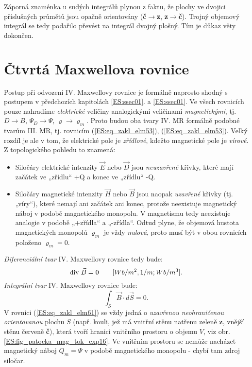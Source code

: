       Záporná znaménka u sudých integrálů plynou z faktu, že plochy ve dvojici příslušných průmětů 
      jsou opačně orientovány (\textbf{č}\(\rightarrow\)\textbf{z}, 
      \textbf{z}\(\rightarrow\)\textbf{č}). Trojný objemový integrál se tedy podařilo převést 
      na integrál dvojný plošný. Tím je důkaz věty dokončen.
      
  \section{Čtvrtá Maxwellova rovnice}\label{ES:sec09}
    Postup při odvození IV. Maxwellovy rovnice je formálně naprosto shodný s postupem v předchozích 
    kapitolách \ref{ES:ssec01}. a \ref{ES:ssec01}. Ve všech rovnicích pouze nahradíme 
    \emph{elektrické} veličiny analogickými veličinami \emph{magnetickými}, tj. \(D\rightarrow 
    B\), \(\Psi_D\rightarrow \Psi\), \(\varrho\rightarrow \varrho_m\). Proto budou oba 
    tvary IV. MR formálně podobné tvarům III. MR, tj. rovnicím (\ref{ES:eq_zakl_elm53}), 
    (\ref{ES:eq_zakl_elm53}). Velký rozdíl je ale v tom, že elektrické pole je \emph{zřídlové}, 
    kdežto magnetické pole je \emph{vírové}. Z topologického pohledu to znamená:
    \begin{itemize}\addtolength{\itemsep}{-0.5\baselineskip}
      \item Siločáry elektrické intenzity \(\vec{E}\) nebo \(\vec{D}\) jsou \emph{neuzavřené} 
            křivky, které mají začátek ve „zřídlu“ +Q a konec ve „zřídlu“ -Q.
    
      \item Siločáry magnetické intenzity \(\vec{H}\) nebo \(\vec{B}\) jsou naopak \emph{uzavřené} 
            křivky (tj. „víry“), které  nemají ani začátek ani konec, protože neexistuje magnetický 
            náboj v podobě magnetického monopolu. V magnetismu tedy neexistuje analogie v podobě 
            „+zřídla“ a „-zřídla“. Odtud plyne, že objemová hustota magnetických monopolů 
            \(\varrho_m\) je vždy \emph{nulová}, proto musí být v obou rovnicích položeno 
            \(\varrho_m = 0\).
    \end{itemize}
    \emph{Diferenciální tvar} IV. Maxwellovy rovnice tedy bude:
    \begin{equation}\label{ES:eq_zakl_elm60}
      \mathrm{div}\;\vec{B} = 0 \qquad [Wb/m^2,1/m; Wb/m^3].
    \end{equation}
    \emph{Integrální tvar} IV. Maxwellovy rovnice bude:
    \begin{equation}\label{ES:eq_zakl_elm61}
      \int_S\vec{B}\cdot d\vec{S} = 0.
    \end{equation}    
    V rovnici (\ref{ES:eq_zakl_elm61}) se vždy jedná o \emph{uzavřenou neohraničenou orientovanou} 
    plochu \(S\) (např. kouli, jež má vnitřní stěnu natřenu zeleně \textbf{z}, vnější stěnu červeně 
    \textbf{č}), která tvoří hranici vnitřního prostoru o objemu \(V\), viz obr. 
    \ref{ES:fig_patocka_mag_tok_exp16}. Ve vnitřním prostoru se nemůže nacházet magnetický náboj 
    \(Q_m = \Psi\) v podobě magnetického monopolu - chybí tam zdroj siločar.
   
